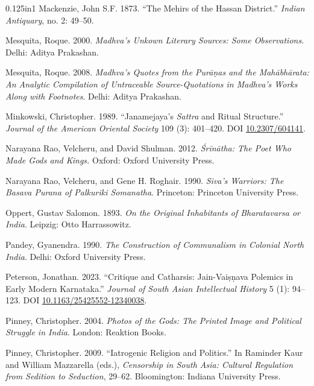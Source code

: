 \begin{hangparas}{0.125in}{1}
          \label{Mackenzie1873}Mackenzie, John S.\thinskip{}F. 1873. “The Mehirs of the Hassan District.” \emph{Indian Antiquary}, no. 2: 49–50.\medskip


          \label{Mesquita2000}Mesquita, Roque. 2000. \emph{Madhva’s Unkown Literary Sources: Some Observations}. Delhi: Aditya Prakashan.\medskip


          \label{Mesquita2008}Mesquita, Roque. 2008. \emph{Madhva’s Quotes from the Purāṇas and the Mahābhārata: An Analytic Compilation of Untraceable Source-Quotations in Madhva’s Works Along with Footnotes}. Delhi: Aditya Prakashan.\medskip


          \label{Minkowski1989}Minkowski, Christopher. 1989. “Janamejaya’s \emph{Sattra} and Ritual Structure.” \emph{Journal of the American Oriental Society} 109 (3): 401–420. DOI \href{https://doi.org/10.2307/604141}{10.2307/604141}.\medskip


          \label{Rao2012}Narayana Rao, Velcheru, and David Shulman. 2012. \emph{Śrīnātha: The Poet Who Made Gods and Kings.} Oxford: Oxford University Press.\medskip


          \label{Rao1990}Narayana Rao, Velcheru, and Gene H. Roghair. 1990. \emph{Siva’s Warriors: The Basava Purana of Palkuriki Somanatha}. Princeton: Princeton University Press.\medskip


          \label{Oppert1893}Oppert, Gustav Salomon. 1893. \emph{On the Original Inhabitants of Bharatavarsa or India}. Leipzig: Otto Harrassowitz.\medskip


          \label{Pandey1990}Pandey, Gyanendra. 1990. \emph{The Construction of Communalism in Colonial North India}. Delhi: Oxford University Press.\medskip


          \label{Peterson2023}Peterson, Jonathan. 2023. “Critique and Catharsis: Jain-Vaiṣṇava Polemics in Early Modern Karnataka.” \emph{Journal of South Asian Intellectual History} 5 (1): 94–123. DOI \href{https://doi.org/10.1163/25425552-12340038}{10.1163/\allowbreak{}25425552-\allowbreak{}12340038}.\medskip


          \label{Pinney2004}Pinney, Christopher. 2004. \emph{Photos of the Gods: The Printed Image and Political Struggle in India}. London: Reaktion Books.\medskip


          \label{Pinney2009}Pinney, Christopher. 2009. “Iatrogenic Religion and Politics.” In Raminder Kaur and William Mazzarella (eds.), \emph{Censorship in South Asia: Cultural Regulation from Sedition to Seduction}, 29–62. Bloomington: Indiana University Press.\medskip



\end{hangparas}
